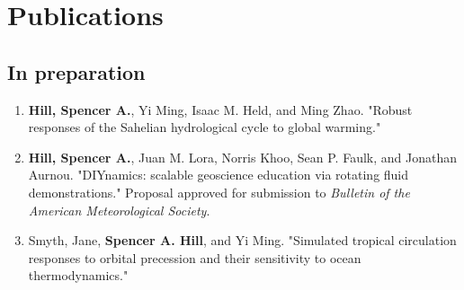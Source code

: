 \documentclass[12pt,letterpaper]{shillcv}
\begin{document}
\section*{Publications}
\label{sec:org43f504a}
\subsection*{In preparation}
\label{sec:org0ee41b9}
\begin{enumerate}
\item \textbf{Hill, Spencer A.}, Yi Ming, Isaac M. Held, and Ming Zhao.  "Robust responses
of the Sahelian hydrological cycle to global warming."
\item \textbf{Hill, Spencer A.}, Juan M. Lora, Norris Khoo, Sean P. Faulk, and Jonathan
Aurnou.  "DIYnamics: scalable geoscience education via rotating fluid
demonstrations."  Proposal approved for submission to \emph{Bulletin of the
American Meteorological Society}.
\item Smyth, Jane, \textbf{Spencer A. Hill}, and Yi Ming.  "Simulated tropical circulation
responses to orbital precession and their sensitivity to ocean
thermodynamics."
\end{enumerate}
\end{document}
